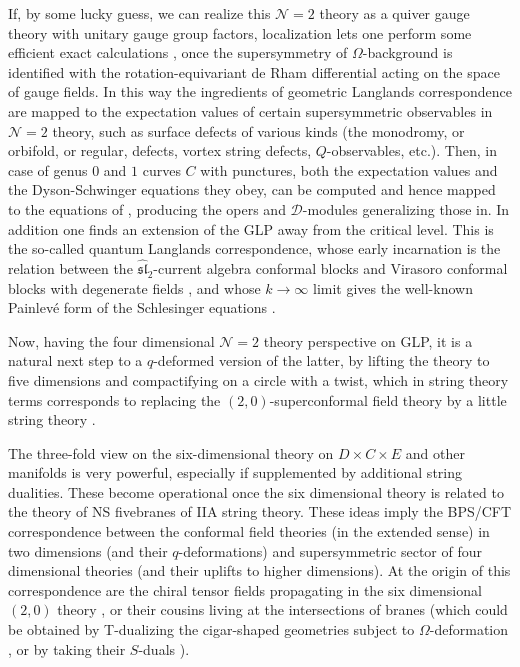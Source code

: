 \documentclass[12pt]{article}
\newcommand\CalD{\mathcal{D}}
\newcommand\CalN{\mathcal{N}}
\begin{document}
If, by some lucky guess, we can realize this ${\CalN}=2$ theory as a quiver gauge theory with unitary gauge group factors, 
localization \cite{Nekrasov:2002qd,LocalizationReview2017}
lets one perform some efficient exact
calculations 
\cite{nekrasovbpscft1, nekrasovbpscft2, nekrasovbpscft3,nekrasovbpscft4,nekrasovbpscft5,Nekrasov:2021tik}, once the supersymmetry of $\Omega$-background
is identified with the rotation-equivariant de Rham differential
acting on the space of gauge fields. In this way the ingredients of geometric Langlands correspondence are mapped to the expectation values of certain supersymmetric observables in ${\CalN}=2$ theory, such as surface defects of various kinds (the monodromy, or orbifold, or regular, defects, vortex string defects, $Q$-observables, etc.). Then, 
in case of genus $0$ and $1$ curves $C$ with punctures, both the expectation values and the Dyson-Schwinger equations they obey, can be 
computed and hence mapped to the equations of \cite{Knizhnik:1984nr, Bernard:1987df}, producing the opers and $\CalD$-modules generalizing those in\cite{Feigin:1994in}. 
In addition one finds an extension of the GLP away from the critical level. This is the so-called quantum Langlands correspondence, whose early incarnation is the relation between the $\widehat{\mathfrak{sl}}_{2}$-current algebra conformal blocks and Virasoro conformal blocks with degenerate
fields \cite{FZ,sto}, and whose $k \to \infty$ limit gives 
the well-known Painlev{\'e} form of the Schlesinger equations
\cite{Teschner:2010je, Litvinov:2013sxa}. 

Now, having the four dimensional ${\CalN}=2$ theory perspective
on GLP, it is a natural next step to a $q$-deformed
version of the latter, by lifting the theory to five dimensions
\cite{NikFive, NikBaulieuLosev, NPS}
and compactifying on a circle with a twist, which in string theory
terms corresponds to replacing the $(2,0)$-superconformal field
theory by a little string theory
\cite{Aganagic:2017smx}. 

The three-fold view on the six-dimensional theory
on $D \times C \times E$ and other manifolds is very powerful, especially if supplemented by
additional string dualities. These become operational
once the six dimensional theory is related to the theory of NS fivebranes of IIA string theory. These ideas imply the BPS/CFT correspondence \cite{NN2004:BPSCFT0}
between the conformal field theories (in the extended sense) in two dimensions (and their $q$-deformations) and supersymmetric sector of four dimensional theories (and their uplifts to higher dimensions). At the origin of this correspondence are the chiral tensor fields propagating in the six dimensional $(2,0)$ theory
\cite{Nekrasov:2002qd}, or their cousins living at the intersections of branes (which could be obtained by T-dualizing the cigar-shaped geometries subject to $\Omega$-deformation \cite{Gaiotto:2017euk}, or by taking their $S$-duals   \cite{nekrasovbpscft3}). 
\end{document}
